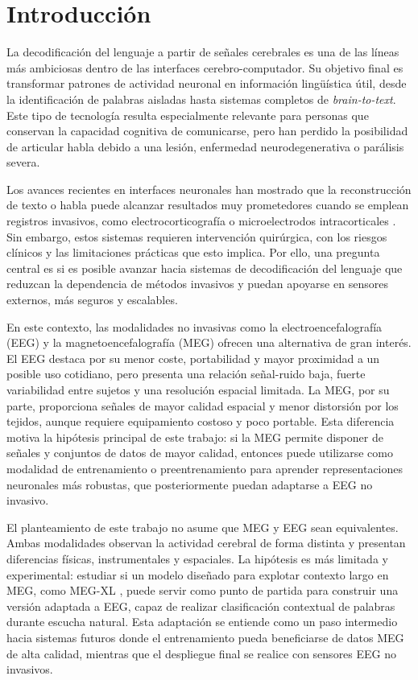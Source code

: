 
\chapter{Introducción}

La decodificación del lenguaje a partir de señales cerebrales es una de las líneas más ambiciosas dentro de las interfaces cerebro-computador. Su objetivo final es transformar patrones de actividad neuronal en información lingüística útil, desde la identificación de palabras aisladas hasta sistemas completos de \textit{brain-to-text}. Este tipo de tecnología resulta especialmente relevante para personas que conservan la capacidad cognitiva de comunicarse, pero han perdido la posibilidad de articular habla debido a una lesión, enfermedad neurodegenerativa o parálisis severa.

Los avances recientes en interfaces neuronales han mostrado que la reconstrucción de texto o habla puede alcanzar resultados muy prometedores cuando se emplean registros invasivos, como electrocorticografía o microelectrodos intracorticales \cite{moses2021neuroprosthesis,willett2023highperformance}. Sin embargo, estos sistemas requieren intervención quirúrgica, con los riesgos clínicos y las limitaciones prácticas que esto implica. Por ello, una pregunta central es si es posible avanzar hacia sistemas de decodificación del lenguaje que reduzcan la dependencia de métodos invasivos y puedan apoyarse en sensores externos, más seguros y escalables.

En este contexto, las modalidades no invasivas como la electroencefalografía (EEG) y la magnetoencefalografía (MEG) ofrecen una alternativa de gran interés. El EEG destaca por su menor coste, portabilidad y mayor proximidad a un posible uso cotidiano, pero presenta una relación señal-ruido baja, fuerte variabilidad entre sujetos y una resolución espacial limitada. La MEG, por su parte, proporciona señales de mayor calidad espacial y menor distorsión por los tejidos, aunque requiere equipamiento costoso y poco portable. Esta diferencia motiva la hipótesis principal de este trabajo: si la MEG permite disponer de señales y conjuntos de datos de mayor calidad, entonces puede utilizarse como modalidad de entrenamiento o preentrenamiento para aprender representaciones neuronales más robustas, que posteriormente puedan adaptarse a EEG no invasivo.

El planteamiento de este trabajo no asume que MEG y EEG sean equivalentes. Ambas modalidades observan la actividad cerebral de forma distinta y presentan diferencias físicas, instrumentales y espaciales. La hipótesis es más limitada y experimental: estudiar si un modelo diseñado para explotar contexto largo en MEG, como MEG-XL \cite{jayalath2026megxl}, puede servir como punto de partida para construir una versión adaptada a EEG, capaz de realizar clasificación contextual de palabras durante escucha natural. Esta adaptación se entiende como un paso intermedio hacia sistemas futuros donde el entrenamiento pueda beneficiarse de datos MEG de alta calidad, mientras que el despliegue final se realice con sensores EEG no invasivos.

